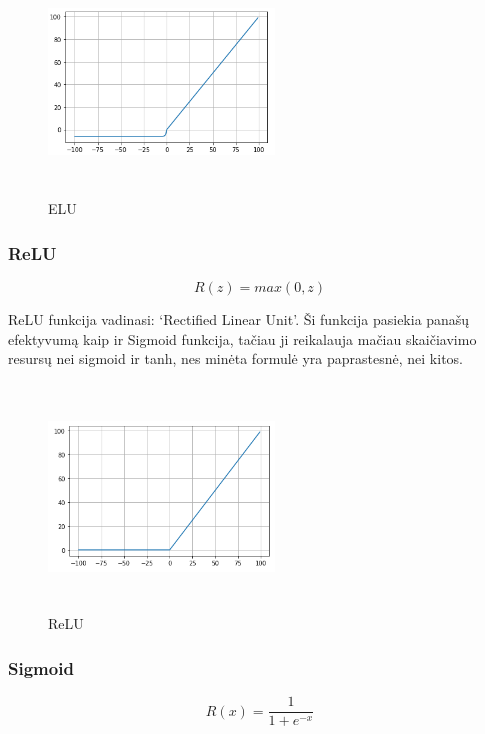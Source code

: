 \documentclass{VUMIFInfKursinis}
\begin{document}
\begin{figure}[ht]
  \centering
  \includegraphics[width=6cm,height=6cm,keepaspectratio]{elu.png}
  \caption{ELU}
  \label{fig:elu}
\end{figure}

\subsubsection{ReLU}
\[
  R(z) = max(0, z)
\]

\par
ReLU funkcija vadinasi: ‘Rectified Linear Unit’. Ši funkcija pasiekia panašų efektyvumą
kaip ir Sigmoid funkcija, tačiau ji reikalauja mačiau skaičiavimo resursų nei sigmoid
ir tanh, nes minėta formulė yra paprastesnė, nei kitos. \cite{salt16}

\begin{figure}[ht]
  \centering
  \includegraphics[width=6cm,height=6cm,keepaspectratio]{relu.png}
  \caption{ReLU}
  \label{fig:relu}
\end{figure}

\subsubsection{Sigmoid}
\[
  R(x) = \frac{1}{1 + e^{-x}}
\]
\end{document}
